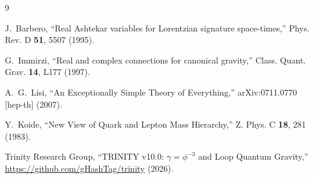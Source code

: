 \documentclass[12pt,a4paper]{article}
\begin{document}

\begin{thebibliography}{9}

J.~Barbero,
``Real Ashtekar variables for Lorentzian signature space-times,''
Phys. Rev. D \textbf{51}, 5507 (1995).

G.~Immirzi,
``Real and complex connections for canonical gravity,''
Class. Quant. Grav. \textbf{14}, L177 (1997).

A.~G.~Lisi,
``An Exceptionally Simple Theory of Everything,''
arXiv:0711.0770 [hep-th] (2007).

Y.~Koide,
``New View of Quark and Lepton Mass Hierarchy,''
Z. Phys. C \textbf{18}, 281 (1983).

Trinity Research Group,
``TRINITY v10.0: $\gamma = \phi^{-3}$ and Loop Quantum Gravity,''
\url{https://github.com/gHashTag/trinity} (2026).

\end{thebibliography}
\end{document}
